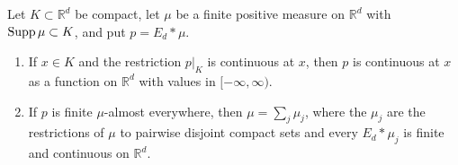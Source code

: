 \begin{theorem}\label{thm:potential-continuity-principle}
Let $K\subset\mathbb R^d$ be compact, let $\mu$ be a finite positive measure on $\mathbb R^d$ with $\operatorname{Supp}\mu\subset K$, and put $p=E_d*\mu$.
\begin{enumerate}
\item If $x\in K$ and the restriction $p|_K$ is continuous at $x$, then $p$ is continuous at $x$ as a function on $\mathbb R^d$ with values in $[-\infty,\infty)$.
\item If $p$ is finite $\mu$-almost everywhere, then $\mu=\sum_j\mu_j$, where the $\mu_j$ are the restrictions of $\mu$ to pairwise disjoint compact sets and every $E_d*\mu_j$ is finite and continuous on $\mathbb R^d$.
\end{enumerate}
\end{theorem}
